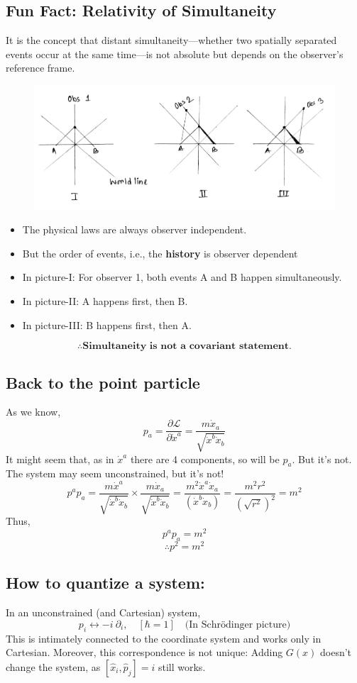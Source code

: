 \documentclass[14pt]{article} %
\begin{document}
\subsection*{Fun Fact: Relativity of Simultaneity}
It is the concept that distant simultaneity—whether two spatially separated events occur at the same time—is not absolute but depends on the observer's reference frame.
\begin{figure}[H]
\centering
\includegraphics[width=0.9\linewidth]{L0_1 (1).jpg}
\caption*{}
\end{figure}
\vspace{-1.5cm}
\begin{itemize}
    \item The physical laws are always observer independent.
    \item But the order of events, i.e., the \textbf{history} is observer dependent
    \item In picture-I: For observer 1, both events A and B happen simultaneously.
    \item In picture-II: A happens first, then B.
    \item In picture-III: B happens first, then A.
\end{itemize}
$$ \boxed{\therefore \textbf{Simultaneity is not a covariant statement.}} $$
\subsection*{Back to the point particle}
As we know,
\[
p_a = \frac{\partial \mathcal{L}}{\partial \dot{x}^a} = \frac{m \dot{x}_a}{\sqrt{\dot{x}^b \dot{x}_b}}
\]
It might seem that, as in $\dot{x}^a$ there are 4 components, so will be $p_a$. But it's not. The system may seem unconstrained, but it's not!
\[
p^a p_a = \frac{m \dot{x}^a}{\sqrt{\dot{x}^b \dot{x}_b}} \times \frac{m \dot{x}_a}{\sqrt{\dot{x}^b \dot{x}_b}} = \frac{m^2 \dot{x}^a \dot{x}_a}{(\dot{x}^b \dot{x}_b)} = \frac{m^2r^2}{(\sqrt{r^2})^2} = m^2
\]
Thus,
\[
p^a p_a = m^2
\]
\[
\therefore p^2 = m^2 \tag{5} \label{eq:5}
\]
\subsection*{How to quantize a system:}
In an unconstrained (and Cartesian) system,
\[
p_i \leftrightarrow -i ~\partial_i, \quad [\hbar = 1] \quad \text{(In Schrödinger picture)}
\]
This is intimately connected to the coordinate system and works only in Cartesian. Moreover, this correspondence is not unique: Adding $G(x)$ doesn't change the system, as $[\hat{x}_i, \hat{p}_j] = i$ still works.
\end{document}
